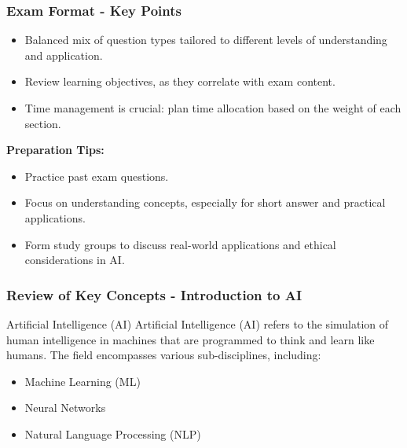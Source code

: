 \documentclass[aspectratio=169]{beamer}
\begin{document}
\begin{frame}[fragile]
    \frametitle{Exam Format - Key Points}
    \begin{itemize}
        \item Balanced mix of question types tailored to different levels of understanding and application.
        \item Review learning objectives, as they correlate with exam content.
        \item Time management is crucial: plan time allocation based on the weight of each section.
    \end{itemize}
    
    \textbf{Preparation Tips:}
    \begin{itemize}
        \item Practice past exam questions.
        \item Focus on understanding concepts, especially for short answer and practical applications.
        \item Form study groups to discuss real-world applications and ethical considerations in AI.
    \end{itemize}
\end{frame}

\begin{frame}[fragile]
  \frametitle{Review of Key Concepts - Introduction to AI}
  \begin{block}{Artificial Intelligence (AI)}
    Artificial Intelligence (AI) refers to the simulation of human intelligence in machines that are programmed to think and learn like humans. The field encompasses various sub-disciplines, including:
  \end{block}
  \begin{itemize}
    \item Machine Learning (ML)
    \item Neural Networks
    \item Natural Language Processing (NLP)
  \end{itemize}
\end{frame}
\end{document}
